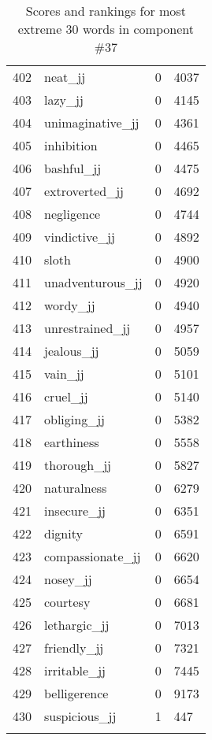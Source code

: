 \begin{longtable}[!htbp]{| rlr@{.}l |}
    402 & neat\_jj & 0 & 4037 \\
    403 & lazy\_jj & 0 & 4145 \\
    404 & unimaginative\_jj & 0 & 4361 \\
    405 & inhibition & 0 & 4465 \\
    406 & bashful\_jj & 0 & 4475 \\
    407 & extroverted\_jj & 0 & 4692 \\
    408 & negligence & 0 & 4744 \\
    409 & vindictive\_jj & 0 & 4892 \\
    410 & sloth & 0 & 4900 \\
    411 & unadventurous\_jj & 0 & 4920 \\
    412 & wordy\_jj & 0 & 4940 \\
    413 & unrestrained\_jj & 0 & 4957 \\
    414 & jealous\_jj & 0 & 5059 \\
    415 & vain\_jj & 0 & 5101 \\
    416 & cruel\_jj & 0 & 5140 \\
    417 & obliging\_jj & 0 & 5382 \\
    418 & earthiness & 0 & 5558 \\
    419 & thorough\_jj & 0 & 5827 \\
    420 & naturalness & 0 & 6279 \\
    421 & insecure\_jj & 0 & 6351 \\
    422 & dignity & 0 & 6591 \\
    423 & compassionate\_jj & 0 & 6620 \\
    424 & nosey\_jj & 0 & 6654 \\
    425 & courtesy & 0 & 6681 \\
    426 & lethargic\_jj & 0 & 7013 \\
    427 & friendly\_jj & 0 & 7321 \\
    428 & irritable\_jj & 0 & 7445 \\
    429 & belligerence & 0 & 9173 \\
    430 & suspicious\_jj & 1 & 447 \\
    \hline
    \caption{Scores and rankings for most extreme 30 words in component \#37} \\
\end{longtable}
